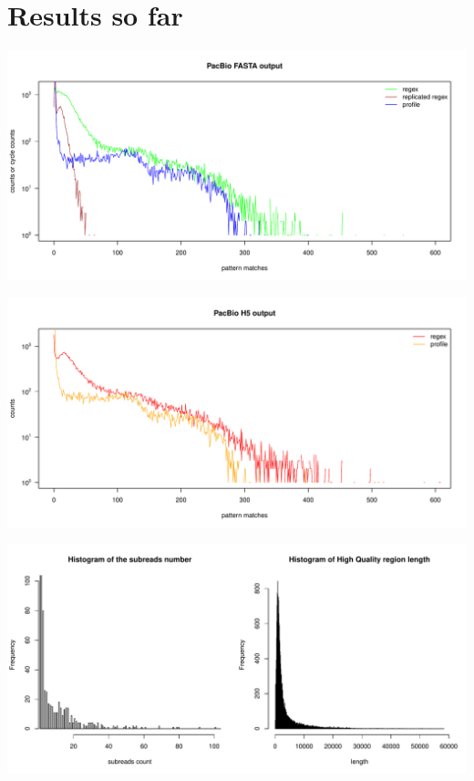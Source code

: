 \documentclass[notitlepage,a4paper]{article}\usepackage[]{graphicx}\usepackage[]{color}
\makeatletter
\def\maxwidth{ %
  \ifdim\Gin@nat@width>\linewidth
    \linewidth
  \else
    \Gin@nat@width
  \fi
}
\newenvironment{knitrout}{}{} %
\makeatother
\begin{document}
\section{Results so far}



\begin{knitrout}
\color{fgcolor}
\includegraphics[width=\maxwidth]{figure/unnamed-chunk-2-1} 

\end{knitrout}

\begin{knitrout}
\color{fgcolor}
\includegraphics[width=\maxwidth]{figure/unnamed-chunk-3-1} 

\end{knitrout}

\begin{knitrout}
\color{fgcolor}
\includegraphics[width=\maxwidth]{figure/unnamed-chunk-4-1} 

\end{knitrout}
\end{document}
